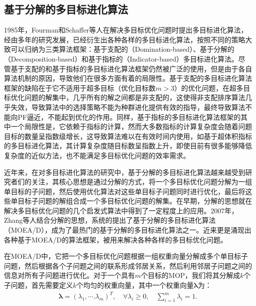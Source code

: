 \subsection{基于分解的多目标进化算法}
\label{subsec:背景介绍:多目标组合优化算法:基于分解的多目标进化算法}
1985年，Fourman和Schaffer等人在解决多目标优化问题时提出多目标进化算法\cite{fourman1985compaction,schaffer1985multiple}，经由多年的研究发展，已经衍生出各种各样的多目标进化算法，按照不同的策略大致可以归纳为三类算法框架：基于支配的（Domination-based）、基于分解的（Decomposition-based）和基于指标的（Indicator-based）多目标进化算法。尽管基于支配的和基于指标的多目标进化算法框架仍然被广泛的使用，但是由于各自算法机制的原因，导致他们在很多方面有着的局限性。基于支配的多目标进化算法框架的缺陷在于它不适用于超多目标（优化目标数$m > 3$）的优化问题，在超多目标优化问题的解集中，几乎所有的解之间都是非支配的，这使得非支配排序算法几乎失效，导致算法中的选择策略不能为种群进化提供有效的指导，最终导致算法不能向PF逼近，不能起到优化的作用\cite{ishibuchi2008behavior,giagkiozis2015methods}。同样，基于指标的多目标进化算法框架的其中一个局限性是，它依赖于指标的计算，然而大多数指标的计算复杂度会随着问题目标的数量呈指数级增长，这导致算法难以在有效时间内使用，如基于超体积指标的多目标进化算法，其计算复杂度随目标数呈指数上升，即使目前有很多能够降低复杂度的近似方法，也不能满足多目标优化问题的效率需求。
\par
近年来，在对多目标进化算法的研究中，基于分解的多目标进化算法越来越受到研究者们的关注，其核心思想是通过分解的方式，将一个多目标优化问题分解为一组单目标的子问题，然后使用优化算法对这些单目标子问题同时进行优化，最后将这些单目标子问题的解组合成一个多目标优化问题的解集。在早期，分解的思想就在解决多目标优化问题的几个启发式算法中得到了一定程度上的应用\cite{ishibuchi1998multi,jin2001adapting,jaszkiewicz2002performance,paquete2003two,hughes2003multiple}。2007年，Zhang等人结合分解的思想，系统的提出了基于分解的多目标进化算法（MOEA/D）\cite{zhang2007moea}，成为了最热门的基于分解的多目标进化算法之一。近来更是涌现出各种基于MOEA/D的算法框架，被用来解决各种各样的多目标优化问题\cite{ke2013moea,ke2014hybridization}。
\par
在MOEA/D中，它把一个多目标优化问题根据一组权重向量分解成多个单目标子问题，然后根据各个子问题之间的联系形成邻居关系，然后利用邻居子问题之间的信息对所有子问题进行优化。对于一个具有$m$个目标的MOP，我们将其分解成$k$个子问题，首先需要定义$k$个均匀的权重向量，其中一个权重向量$\boldsymbol{\lambda}$为：
\begin{align}
    \label{eq:权重向量}
    \boldsymbol{\lambda} = (\lambda_1, \cdots. \lambda_m)^T, \quad \forall \lambda_i \geq 0 , \quad \sum_{i=1}^m \lambda_i = 1. 
\end{align}
